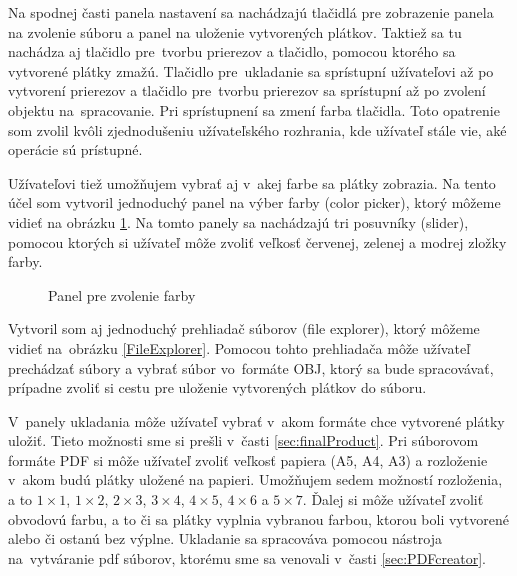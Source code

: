 Na spodnej časti panela nastavení sa nachádzajú tlačidlá pre zobrazenie panela na zvolenie súboru a panel na uloženie vytvorených plátkov. Taktiež sa tu nachádza aj tlačidlo pre~tvorbu prierezov a tlačidlo, pomocou ktorého sa vytvorené plátky zmažú.
Tlačidlo pre~ukladanie sa sprístupní užívateľovi až po vytvorení prierezov a tlačidlo pre~tvorbu prierezov sa sprístupní až po zvolení objektu na~spracovanie. Pri sprístupnení sa zmení farba tlačidla. Toto opatrenie som zvolil kvôli zjednodušeniu užívateľského rozhrania, kde užívateľ stále vie, aké operácie sú prístupné.








Užívateľovi tiež umožňujem vybrať aj v~akej farbe sa plátky zobrazia. Na tento účel som vytvoril jednoduchý panel na výber farby (color picker), ktorý môžeme vidieť na obrázku \ref{fig:colorPicker}.
Na tomto panely sa nachádzajú tri posuvníky (slider), pomocou ktorých si užívateľ môže zvoliť veľkosť červenej, zelenej a modrej zložky farby. 

\begin{figure}[H]
\centering
{}\quad
\caption{Panel pre zvolenie farby}
\label{fig:colorPicker}
\end{figure}


Vytvoril som aj jednoduchý prehliadač súborov (file explorer), ktorý môžeme vidieť na~obrázku \ref{FileExplorer}. Pomocou tohto prehliadača môže užívateľ prechádzať súbory a vybrať súbor vo~formáte OBJ, ktorý sa bude spracovávať, prípadne zvoliť si cestu pre uloženie vytvorených plátkov do súboru. 

V~panely ukladania môže užívateľ vybrať v~akom formáte chce vytvorené plátky uložiť. Tieto možnosti sme si prešli v~časti \ref{sec:finalProduct}. Pri súborovom formáte PDF si môže užívateľ zvoliť veľkosť papiera (A5, A4, A3) a rozloženie v~akom budú plátky uložené na papieri. Umožňujem sedem možností rozloženia, a to $1\times1$, $1\times2$, $2\times3$, $3\times4$, $4\times5$, $4\times6$ a $5\times7$.
Ďalej si môže užívateľ zvoliť obvodovú farbu, a to či sa plátky vyplnia vybranou farbou, ktorou boli vytvorené alebo či ostanú bez výplne. 
Ukladanie sa spracováva pomocou nástroja na~vytváranie pdf súborov, ktorému sme sa venovali v~časti \ref{sec:PDFcreator}.


